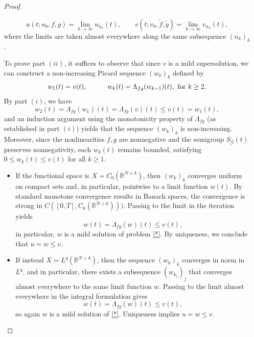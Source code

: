 \documentclass[10pt,a4paper]{amsart}
\begin{document}
\begin{proof}
\begin{itemize}
		$$u(t;u_0,f,g) = \lim\limits_{k\rightarrow\infty} u_{n_k}(t),\qquad  v(t;v_0,\tilde{f},\tilde{g}) = \lim\limits_{k\rightarrow\infty} v_{n_k}(t),$$ 
		where the limits are taken almost everywhere along the same subsequence $(n_k)_k$.\\
	\end{itemize}
	To prove part $(ii)$, it suffices to observe that since $v$ is a mild supersolution, we can construct a non-increasing Picard sequence $(w_k)_k$ defined by
	$$
	w_{1}(t) =v(t),\qquad\quad w_{k}(t) =\Lambda_{fg} (w_{k-1})(t),\,\,\hbox{for}\,\, k\geq2.
	$$
	By part $(i)$, we have
	$$w_{2}(t) =\Lambda_{fg} (w_1)(t)=\Lambda_{fg} (v)(t)\leq v(t)=w_1(t),$$ 
	and an induction argument using the monotonicity property of $\Lambda_{fg}$ (as established in part $(i)$) yields that the sequence $(w_k)_k$  is non-increasing. Moreover, since the nonlinearities $f,g$ are nonnegative and the semigroup $S_\mathcal{G}(t)$ preserves nonnegativity, each $w_k(t)$ remains bounded, satisfying $0\leq w_k(t)\leq v(t)$ for all $k\geq1$.
	\begin{itemize}
		\item  If the functional space is $X=C_0(\mathbb{R}^{N+k})$, then $(w_k)_k$ converges uniform on compact sets and, in particular,
		pointwise to a limit function $w(t)$. By standard monotone convergence results in Banach spaces, the convergence is strong in $C([0,T],C_0(\mathbb{R}^{N+k})))$. Passing to the limit in the iteration yields
		$$w(t)= \Lambda_{fg} (w)(t)\leq v(t),$$
		in particular, $w$ is a mild solution of problem \eqref{*}. By uniqueness, we conclude that $u=w\leq v$.
		\item  If instead $X=L^q(\mathbb{R}^{N+k})$,  then the sequence $(w_k)_k$ converges in norm in $L^q$, and in particular, there exists a subsequence $(w_{k_j})_j$ that converges almost everywhere to the same limit function $w$. Passing to the limit almost everywhere in the integral formulation gives
		$$w(t)= \Lambda_{fg} (w)(t)\leq v(t),$$
		so again $w$ is a mild solution of \eqref{*}. Uniqueness implies $u=w\leq v$.
	\end{itemize} 
\end{proof}
\end{document}
